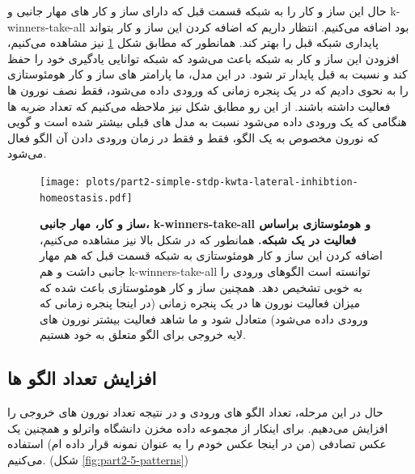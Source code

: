     حال این ساز و کار را به شبکه قسمت قبل که دارای ساز و کار های مهار جانبی و 
    k-winners-take-all 
    بود اضافه می‌کنیم. انتظار داریم که اضافه کردن این ساز و کار بتواند پایداری شبکه قبل را بهتر کند.
    همانطور که مطابق شکل 
    \ref{fig:part2-simple-stdp-kwta-lateral-inhibtion-homeostasis} 
    نیز مشاهده می‌کنیم، افزودن این ساز و کار به شبکه باعث می‌شود که شبکه توانایی یادگیری خود را حفظ کند و نسبت به قبل پایدار تر شود. در این مدل، ما پارامتر های ساز و کار هومئوستازی را به نحوی دادیم که در یک پنجره زمانی که ورودی داده می‌شود، فقط نصف نورون ها فعالیت داشته باشند. از این رو مطابق شکل نیز ملاحظه می‌کنیم که تعداد ضربه ها هنگامی که یک ورودی داده می‌شود نسبت به مدل های قبلی بیشتر شده است و گویی که نورون مخصوص به یک الگو، فقط و فقط در زمان ورودی دادن آن الگو فعال می‌شود.

    \begin{figure}[!ht]
        \centering
        \texttt{[image: plots/part2-simple-stdp-kwta-lateral-inhibtion-homeostasis.pdf]} 
        \captionsetup{width=.9\linewidth}
        \caption{\textbf{ ساز و کار، مهار جانبی، 
        k-winners-take-all و 
        هومئوستازی براساس فعالیت در یک شبکه.} همانطور که در شکل بالا نیز مشاهده می‌کنیم، اضافه کردن این ساز و کار هومئوستازی به شبکه قسمت قبل که هم مهار جانبی داشت و هم 
        k-winners-take-all 
        توانسته است الگوهای ورودی را به خوبی تشخیص دهد. همچنین ساز و کار هومئوستازی باعث شده که میزان فعالیت نورون ها در یک پنجره زمانی
        (در اینجا پنجره زمانی که ورودی داده می‌شود) 
        متعادل شود و ما شاهد فعالیت بیشتر نورون های لایه خروجی برای الگو متعلق به خود هستیم.}
        \label{fig:part2-simple-stdp-kwta-lateral-inhibtion-homeostasis}
    \end{figure}

    \subsection{افزایش تعداد الگو ها}
        حال در این مرحله، تعداد الگو های ورودی و در نتیجه تعداد نورون های خروجی را افزایش می‌دهیم. برای اینکار از مجموعه داده مخزن دانشگاه واترلو و همچنین یک عکس تصادفی
        (من در اینجا عکس خودم را به عنوان نمونه قرار داده ام)
        استفاده می‌کنیم.
        (شکل \ref{fig:part2-5-patterns})

